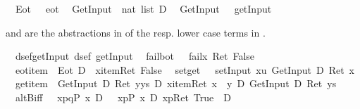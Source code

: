 \begin{isabellebody}
\ \ {\isachardoublequote}Eot\ {\isasymequiv}\ {\isasymUp}\ eot{\isachardoublequote}\isanewline
\ \ GetInput\ {\isacharcolon}{\isacharcolon}\ {\isachardoublequote}nat\ list\ D{\isachardoublequote}\isanewline
\ \ {\isachardoublequote}GetInput\ {\isasymequiv}\ {\isasymUp}\ getInput{\isachardoublequote}\isamarkupfalse%
%
\begin{isamarkuptext}%
 and  are the abstractions in  of the
resp. lower case terms in .%
\end{isamarkuptext}%
\isamarkuptrue%
\isanewline
\ \ dsef{\isacharunderscore}getInput{\isacharcolon}\ {\isachardoublequote}dsef\ getInput{\isachardoublequote}\isanewline
\ \ fail{\isacharunderscore}bot{\isacharcolon}\ {\isachardoublequote}{\isasymturnstile}\ {\isacharbrackleft}{\isacharhash}\ fail{\isacharbrackright}{\isacharparenleft}{\isasymlambda}x{\isachardot}\ Ret\ False{\isacharparenright}{\isachardoublequote}\isanewline
\ \ eot{\isacharunderscore}item{\isacharcolon}\ {\isachardoublequote}{\isasymturnstile}\ Eot\ {\isasymlongrightarrow}\isactrlsub D\ {\isacharbrackleft}{\isacharhash}\ x{\isasymleftarrow}item{\isacharbrackright}{\isacharparenleft}Ret\ False{\isacharparenright}{\isachardoublequote}\isanewline
\ \ set{\isacharunderscore}get{\isacharcolon}\ \ {\isachardoublequote}{\isasymturnstile}\ {\isasymlangle}setInput\ x{\isasymrangle}{\isacharparenleft}{\isasymlambda}u{\isachardot}\ GetInput\ {\isacharequal}\isactrlsub D\ Ret\ x{\isacharparenright}{\isachardoublequote}\isanewline
\ \ get{\isacharunderscore}item{\isacharcolon}\ {\isachardoublequote}{\isasymturnstile}\ GetInput\ {\isacharequal}\isactrlsub D\ Ret\ {\isacharparenleft}y{\isacharhash}ys{\isacharparenright}\ {\isasymlongrightarrow}\isactrlsub D\ {\isasymlangle}x{\isasymleftarrow}item{\isasymrangle}{\isacharparenleft}Ret\ {\isacharparenleft}x\ {\isacharequal}\ y{\isacharparenright}\ {\isasymand}\isactrlsub D\ GetInput\ {\isacharequal}\isactrlsub D\ Ret\ ys{\isacharparenright}{\isachardoublequote}\isanewline
\ \ altB{\isacharunderscore}iff{\isacharcolon}\ {\isachardoublequote}{\isasymturnstile}\ {\isacharbrackleft}{\isacharhash}\ x{\isasymleftarrow}p{\isasymparallel}q{\isacharbrackright}{\isacharparenleft}P\ x{\isacharparenright}\ {\isasymlongleftrightarrow}\isactrlsub D\ {\isacharparenleft}\ {\isacharbrackleft}{\isacharhash}\ x{\isasymleftarrow}p{\isacharbrackright}{\isacharparenleft}P\ x{\isacharparenright}\ {\isasymand}\isactrlsub D\ {\isasymlangle}x{\isasymleftarrow}p{\isasymrangle}{\isacharparenleft}Ret\ True{\isacharparenright}\ {\isacharparenright}\ {\isasymor}\isactrlsub D\ \isanewline

\end{isabellebody}

